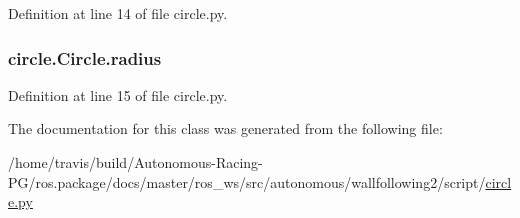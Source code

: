 Definition at line 14 of file circle.\+py.

\subsubsection[{\texorpdfstring{radius}{radius}}]{\setlength{\rightskip}{0pt plus 5cm}circle.\+Circle.\+radius}\hypertarget{classcircle_1_1_circle_a33aec6cd768f0a1850fae92cf3fcbc95}{}\label{classcircle_1_1_circle_a33aec6cd768f0a1850fae92cf3fcbc95}


Definition at line 15 of file circle.\+py.



The documentation for this class was generated from the following file\+:\begin{DoxyCompactItemize}
\item 
/home/travis/build/\+Autonomous-\/\+Racing-\/\+P\+G/ros.\+package/docs/master/ros\+\_\+ws/src/autonomous/wallfollowing2/script/\hyperlink{circle_8py}{circle.\+py}\end{DoxyCompactItemize}
